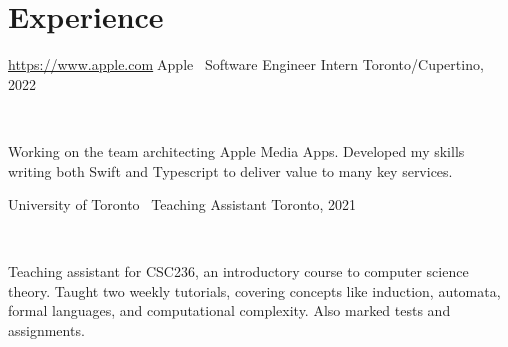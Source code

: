 \documentclass[]{style}
\begin{document}

\section{Experience}

\begin{entrylist}


\vspace{2mm}

\entry
{\url{https://www.apple.com}{Apple} \ {\normalfont Software Engineer Intern}}
{Toronto/Cupertino, 2022}
{ ~ \vspace{-2.5mm}

  

Working on the team architecting Apple Media Apps. Developed my skills writing both Swift and Typescript to deliver value to many key services. 
}

\entry
{University of Toronto \ {\normalfont Teaching Assistant}}
{Toronto, 2021}
{ ~ \vspace{-2.5mm}

  

Teaching assistant for CSC236, an introductory course to computer science theory. Taught two weekly tutorials, covering concepts like induction, automata, formal languages, and computational complexity. Also marked tests and assignments. 
}

%
%
%
%

%
%
%

\end{entrylist}
\end{document}

